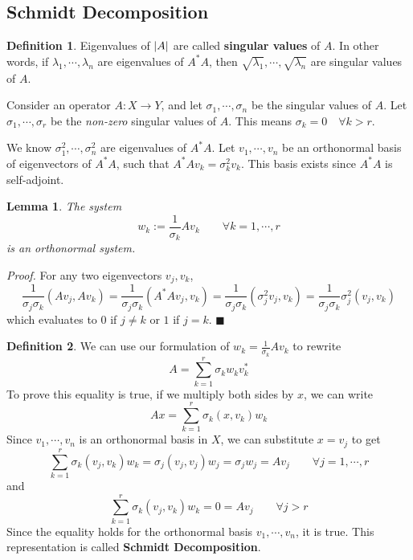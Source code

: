 \documentclass[a4paper,10pt]{book}
\theoremstyle{plain}
\theoremstyle{plain}
\newtheorem{lemma}[theorem]{Lemma}
\newenvironment{lproof}{\textsl{Proof.}}{\hfill$\blacksquare$}
\theoremstyle{definition}
\newtheorem{definition}{Definition}[section]
\begin{document}
\subsection{Schmidt Decomposition}

\begin{definition}
Eigenvalues of $\lvert A\rvert$ are called \textbf{singular values} of $A$. In other words, if $\lambda_{1}, \cdots, \lambda_{n}$ are eigenvalues of $A^{*}A$, then $\sqrt{\lambda_{1}}, \cdots, \sqrt{\lambda_{n}}$ are singular values of $A$. 
\end{definition}

Consider an operator $A : X \rightarrow Y$, and let $\sigma_{1}, \cdots, \sigma_{n}$ be the singular values of $A$. Let $\sigma_{1}, \cdots, \sigma_{r}$ be the \textit{non-zero} singular values of $A$. This means $\sigma_{k} = 0 \quad \forall k > r$. 

We know $\sigma_{1}^{2}, \cdots, \sigma_{n}^{2}$ are eigenvalues of $A^{*}A$. Let $v_{1}, \cdots, v_{n}$ be an orthonormal basis of eigenvectors of $A^{*}A$, such that $A^{*}Av_{k} = \sigma_{k}^{2} v_{k}$. This basis exists since $A^{*}A$ is self-adjoint. 

\begin{lemma}
The system 
$$w_{k} := \frac{1}{\sigma_{k}} Av_{k} \qquad \forall k = 1, \cdots, r$$
is an orthonormal system. 
\end{lemma}

\begin{lproof}
For any two eigenvectors $v_{j}, v_{k}$, 
$$\frac{1}{\sigma_{j} \sigma_{k}} (Av_{j}, Av_{k}) = \frac{1}{\sigma_{j} \sigma_{k}} (A^{*} Av_{j}, v_{k}) = \frac{1}{\sigma_{j} \sigma_{k}} (\sigma_{j}^{2} v_{j}, v_{k}) = \frac{1}{\sigma_{j} \sigma_{k}} \sigma_{j}^{2} (v_{j}, v_{k})$$
which evaluates to 0 if $j \neq k$ or $1$ if $j = k$. 
\end{lproof}

\begin{definition}
We can use our formulation of $w_{k} = \frac{1}{\sigma_{k}} Av_{k}$ to rewrite 
$$A = \sum_{k = 1}^{r} \sigma_{k} w_{k} v_{k}^{*}$$
To prove this equality is true, if we multiply both sides by $x$, we can write 
$$Ax = \sum_{k = 1}^{r} \sigma_{k} (x, v_{k}) w_{k}$$
Since $v_{1}, \cdots, v_{n}$ is an orthonormal basis in $X$, we can substitute $x = v_{j}$ to get 
$$\sum_{k = 1}^{r} \sigma_{k} (v_{j}, v_{k}) w_{k} = \sigma_{j} (v_{j}, v_{j}) w_{j} = \sigma_{j} w_{j} = Av_{j} \qquad \forall j = 1, \cdots, r$$
and 
$$\sum_{k = 1}^{r} \sigma_{k} (v_{j}, v_{k}) w_{k} = 0 = Av_{j} \qquad \forall j > r$$
Since the equality holds for the orthonormal basis $v_{1}, \cdots, v_{n}$, it is true. This representation is called \textbf{Schmidt Decomposition}.
\end{definition}
\end{document}
